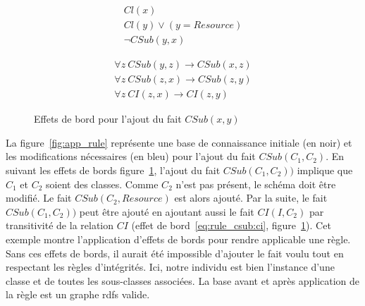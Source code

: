 \begin{figure}[htb]
    \begin{subfigure}{.45\textwidth}
        \begin{align}
            Cl(x)\\
            Cl(y) \lor (y = Resource)\\
            \neg CSub(y, x)
        \end{align}
    \end{subfigure}
    \hfill
    \begin{subfigure}{.4\textwidth}
        \begin{align}
            \forall z ~ CSub(y, z) \to CSub(x, z)\\
            \forall z ~ CSub(z, x) \to CSub(z, y)\\
            \forall z ~ CI(z, x) \to CI(z, y) \label{eq:rule_csub:ci}
        \end{align}
    \end{subfigure}
    \caption{Effets de bord pour l'ajout du fait $CSub(x, y)$}
    \label{eq:rule_csub}
\end{figure}

\begin{example}
    La figure~\ref{fig:app_rule} représente une base de connaissance initiale (en noir) et les modifications nécessaires (en bleu) pour l'ajout du fait $CSub(C_1, C_2)$.
    En suivant les effets de bords figure~\ref{eq:rule_csub}, l'ajout du fait $CSub(C_1, C_2))$ implique que $C_1$ et $C_2$ soient des classes.
    Comme $C_2$ n'est pas présent, le schéma doit être modifié.
    Le fait $CSub(C_2, Resource)$ est alors ajouté.
    Par la suite, le fait $CSub(C_1, C_2))$ peut être ajouté en ajoutant aussi le fait $CI(I, C_2)$ par transitivité de la relation $CI$ (effet de bord~\ref{eq:rule_csub:ci}, figure~\ref{eq:rule_csub}).
    Cet exemple montre l'application d'effets de bords pour rendre applicable une règle.
    Sans ces effets de bords, il aurait été impossible d'ajouter le fait voulu tout en respectant les règles d'intégrités.
    Ici, notre individu est bien l'instance d'une classe et de toutes les sous-classes associées.
    La base avant et après application de la règle est un graphe \gls{rdfs} valide.
\end{example}

